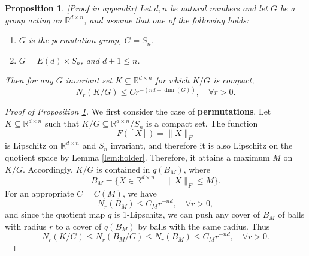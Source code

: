 \documentclass[10pt,a4paper]{amsart}
\newtheorem{prop}{Proposition}
\newcommand{\RR}{\mathbb{R}}
\begin{document}
\begin{prop}\label{prop:dim}[Proof in appendix]
Let  $d,n$ be natural numbers and let $G$ be a group acting on $\RR^{d\times n}$, and assume that one of the  following holds:
\begin{enumerate}
\item $G$ is the permutation group, $G=S_n$.
\item  $G=E(d)\times S_n $, and $d+1\leq n$.
\end{enumerate}
Then for any $G$ invariant set $K\subseteq \RR^{d\times n}$ for which $K/G$ is compact, 
$$N_r(K/G)\leq Cr^{-(nd-\dim(G))}, \quad \forall r>0.$$
\end{prop}

\begin{proof}[Proof of Proposition \ref{prop:dim}]
We first consider the case of \textbf{permutations}. Let $K\subseteq \RR^{d\times n}$ such that $K/G\subseteq \RR^{d\times n}/S_n $ is a compact set. The function
$$F([X])=\|X\|_F $$
is Lipschitz on $\RR^{d\times n}$ and $S_n$ invariant, and therefore it is also Lipschitz
 on the quotient space by Lemma \ref{lem:holder}. Therefore, it attains a maximum $M$ on $K/G $. Accordingly, $K/G$ is contained in $q(B_M) $, where 
$$B_M=\{X\in \RR^{d\times n}| \quad \|X\|_F\leq M \} .$$
For an appropriate $C=C(M)$, we have
$$N_r(B_M)\leq C_Mr^{-nd}, \quad \forall r>0 ,$$
and since the quotient map $q$ is 1-Lipschitz, we can push any cover of $B_M$ of balls with radius $r$ to a cover of $q(B_M)$ by balls with the same radius. Thus 
$$N_r(K/G)\leq N_r(B_M/G)\leq N_r(B_M)
\leq C_Mr^{-nd}, \quad \forall r>0 . $$


\end{proof}
\end{document}
